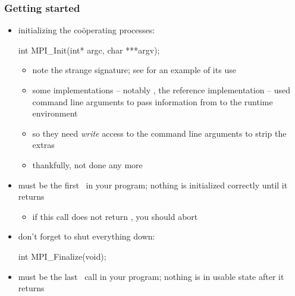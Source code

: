 \begin{frame}[fragile]
%
  \frametitle{Getting started}
%
  \begin{itemize}
%
%
  \item initializing the co\"operating processes:
    \begin{C}
int MPI_Init(int* argc, char ***argv);
    \end{C}
    \begin{itemize}
    \item note the strange signature; see  for an example of its use
    \item some implementations -- notably , the reference implementation --
      used command line arguments to pass information from  to the runtime
      environment
    \item so they need {\em write} access to the command line arguments to strip the extras
    \item thankfully, not done any more
    \end{itemize}
%
  \item must be the first \mpi\ in your program; nothing is initialized correctly until it
    returns
    \begin{itemize}
    \item if this call does not return , you should abort
    \end{itemize}
% 
  \item don't forget to shut everything down:
    \begin{C}
int MPI_Finalize(void);
    \end{C}
%
  \item must be the last \mpi\ call in your program; nothing is in usable state after it
    returns
%
  \end{itemize}
%
\end{frame}

